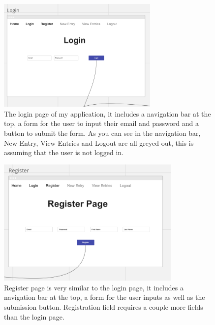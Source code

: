 \begin{figure}[H]
    \centering
    \includegraphics[width=0.7\textwidth]{Assets/login_page.png}
    \caption{The login page of my application, it includes a navigation bar at the top, a form for the user to input their email and password and a button to submit the form. As you can see in the navigation bar, New Entry, View Entries and Logout are all greyed out, this is assuming that the user is not logged in.}
\end{figure}

\begin{figure}[H]
    \centering
    \includegraphics[width=0.8\textwidth]{Assets/register_page.png}
    \caption{Register page is very similar to the login page, it includes a navigation bar at the top, a form for the user inputs as well as the submission button. Registration field requires a couple more fields than the login page.}
\end{figure}

